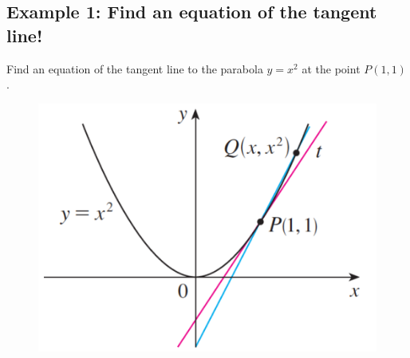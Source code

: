 \documentclass[10pt]{book}
\theoremstyle{definition}
\begin{document}
\subsection*{Example 1: Find an equation of the tangent line!}
Find an equation of the tangent line to the parabola $y=x^2$ at the point $P(1,1)$.
\begin{figure}[h!]
    \includegraphics[scale=0.4]{fig1.png}
\end{figure}
\end{document}
